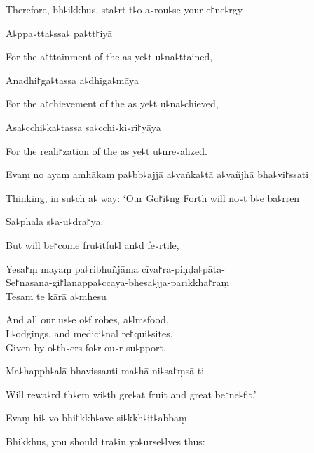 \begin{english}
  Therefore, bh꜕ikkhus, sta꜕rt t꜕o a꜕rou꜕se your e꜓ne꜕rgy
\end{english}

A꜕ppa꜕tta꜕ssa꜕ pa꜕tt꜓iyā

\begin{english}
  For the a꜓ttainment of the as ye꜕t u꜕na꜕ttained,
\end{english}

Anadhi꜓ga꜕tassa a꜕dhiga꜕māya

\begin{english}
  For the a꜓chievement of the as ye꜕t u꜕na꜕chieved,
\end{english}

Asa꜕cchi꜕ka꜕tassa sa꜕cchi꜕ki꜕ri꜓yāya

\begin{english}
  For the reali꜓zation of the as ye꜕t u꜕nre꜕alized.
\end{english}

Evaṃ no ayaṃ amhākaṃ pa꜕bb꜕ajjā a꜕vaṅka꜕tā a꜕vañjhā bha꜕vi꜓ssati

\begin{english}
  Thinking, in su꜕ch a꜕ way: `Our Go꜓i꜕ng Forth will no꜕t b꜕e ba꜕rren
\end{english}

Sa꜕phalā s꜕a-u꜕dra꜓yā.

\begin{english}
  But will be꜓come fru꜕itfu꜕l an꜕d fe꜕rtile,
\end{english}

Yesa꜓ṃ mayaṃ pa꜕ribhuñjāma cīva꜓ra-piṇḍa꜕pāta-\\
Se꜓nāsana-gi꜓lānappa꜕ccaya-bhesa꜕jja-parikkhā꜓raṃ\\
Tesaṃ te kārā a꜕mhesu

\begin{english}
  And all our us꜕e o꜕f robes, a꜕lmsfood,\\
  L꜕odgings, and medici꜕nal re꜓qui꜕sites,\\
  Given by o꜕th꜕ers fo꜕r ou꜕r su꜕pport,
\end{english}

Ma꜕happh꜕alā bhavissanti ma꜕hā-ni꜕sa꜓ṃsā-ti

\begin{english}
  Will rewa꜕rd th꜕em wi꜕th gre꜕at fruit and great be꜓ne꜕fit.'
\end{english}

Evaṃ hi꜕ vo bhi꜓kkh꜕ave si꜕kkh꜕it꜕abbaṃ

\begin{english}
  Bhikkhus, you should tra꜕in yo꜕urse꜕lves thus:
\end{english}

